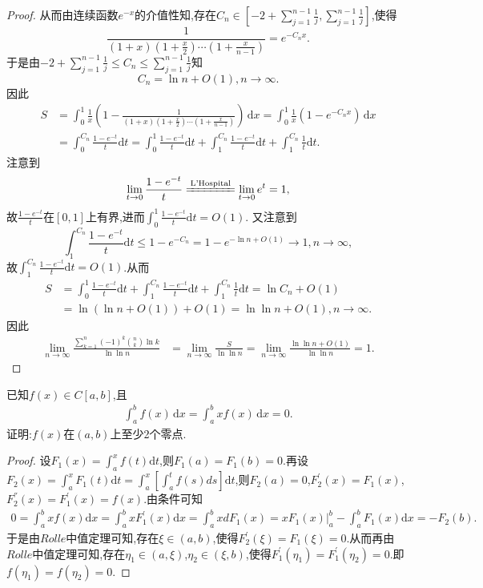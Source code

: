 \documentclass[../../main.tex]{subfiles}%
\begin{document}
\begin{proof}
从而由连续函数$e^{-x}$的介值性知,存在$C_n\in \left[ -2+\sum\limits_{j=1}^{n-1}{\frac{1}{j}},\sum\limits_{j=1}^{n-1}{\frac{1}{j}} \right]$,使得
$$\frac{1}{(1+x)\left(1+\frac{x}{2}\right)\cdots\left(1+\frac{x}{n-1}\right)}=e^{-C_nx}.$$
于是由$-2+\sum\limits_{j=1}^{n-1}{\frac{1}{j}}\leqslant C_n\leqslant \sum\limits_{j=1}^{n-1}{\frac{1}{j}}$知
$$C_n=\ln n+O(1),n\rightarrow \infty.$$
因此
\begin{align*}
S&=\int_0^1{\frac{1}{x}\left( 1-\frac{1}{(1+x)\left(1+\frac{x}{2}\right)\cdots\left(1+\frac{x}{n-1}\right)} \right)\,\mathrm{d}x}=\int_0^1{\frac{1}{x}\left( 1-e^{-C_nx} \right)\,\mathrm{d}x}
\\
&=\int_0^{C_n}{\frac{1-e^{-t}}{t}\mathrm{d}t}=\int_0^1{\frac{1-e^{-t}}{t}\mathrm{d}t}+\int_1^{C_n}{\frac{1-e^{-t}}{t}\mathrm{d}t}+\int_1^{C_n}{\frac{1}{t}\mathrm{d}t}.
\end{align*}
注意到
$$\lim_{t\rightarrow 0}\frac{1-e^{-t}}{t}\xlongequal{\text{L'Hospital}}\lim_{t\rightarrow 0}e^t=1,$$
故$\frac{1-e^{-t}}{t}$在$[0,1]$上有界,进而$\int_0^1{\frac{1-e^{-t}}{t}\mathrm{d}t}=O(1)$.
又注意到
$$\int_1^{C_n}{\frac{1-e^{-t}}{t}\mathrm{d}t}\leqslant 1-e^{-C_n}=1-e^{-\ln n+O(1)}\rightarrow 1,n\rightarrow \infty,$$
故$\int_1^{C_n}{\frac{1-e^{-t}}{t}\mathrm{d}t}=O(1)$.从而
\begin{align*}
S&=\int_0^1{\frac{1-e^{-t}}{t}\mathrm{d}t}+\int_1^{C_n}{\frac{1-e^{-t}}{t}\mathrm{d}t}+\int_1^{C_n}{\frac{1}{t}\mathrm{d}t}=\ln C_n+O(1)
\\
&=\ln \left( \ln n+O(1) \right) +O(1)=\ln\ln n+O(1),n\rightarrow \infty.
\end{align*}
因此
\begin{align*}
\lim_{n\rightarrow \infty}\frac{\sum\limits_{k=1}^n{(-1) ^k\binom{n}{k}\ln k}}{\ln\ln n}&=\lim_{n\rightarrow \infty}\frac{S}{\ln\ln n}=\lim_{n\rightarrow \infty}\frac{\ln\ln n+O(1)}{\ln\ln n}=1.
\end{align*}
\end{proof}

\begin{example}
已知$f(x)\in C[a,b]$,且
\begin{align*}
\int_a^b{f\left( x \right)\,\mathrm{d}x}=\int_a^b{xf\left( x \right)\,\mathrm{d}x}=0.
\end{align*}
证明:$f(x)$在$(a,b)$上至少2个零点.
\end{example}
\begin{proof}
设\(F_1(x)=\int_a^x f(t)\mathrm{d}t\),则\(F_1(a)=F_1(b)=0\).再设\(F_2(x)=\int_a^x F_1(t)\mathrm{d}t=\int_a^x\left[\int_a^t f(s)ds\right]\mathrm{d}t\),则\(F_2(a)=0\),\(F_{2}^{\prime}(x)=F_1(x)\),\(F_{2}^{''}(x)=F_{1}^{\prime}(x)=f(x)\).由条件可知
\begin{align*}
0=\int_a^b xf(x)\mathrm{d}x
=\int_a^b xF_{1}^{\prime}(x)\mathrm{d}x
=\int_a^b xdF_1(x)
=xF_1(x)\Big|_{a}^{b}-\int_a^b F_1(x)\mathrm{d}x
=-F_2(b).
\end{align*}
于是由\(Rolle\)中值定理可知,存在\(\xi\in(a,b)\),使得\(F_{2}^{\prime}(\xi)=F_1(\xi)=0\).从而再由\(Rolle\)中值定理可知,存在\(\eta_1\in(a,\xi)\),\(\eta_2\in(\xi,b)\),使得\(F_{1}^{\prime}(\eta_1)=F_{1}^{\prime}(\eta_2)=0\).即\(f(\eta_1)=f(\eta_2)=0\).
\end{proof}
\end{document}
